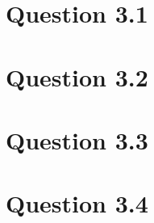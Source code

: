 \documentclass[10pt]{article}
\begin{document}

\section*{Question 3.1} %
\label{sec:question_3_1}


\section*{Question 3.2} %
\label{sec:question_3_2}


\section*{Question 3.3} %
\label{sec:question_3_3}


\section*{Question 3.4} %
\label{sec:question_3_4}





\end{document}
